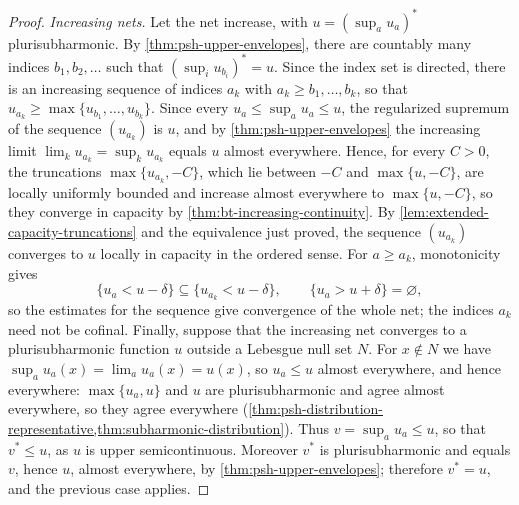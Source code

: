 \begin{proof}
\emph{Increasing nets.} Let the net increase, with $u=(\sup_au_a)^*$ plurisubharmonic. By \cref{thm:psh-upper-envelopes}, there are countably many indices $b_1,b_2,\ldots$ such that $(\sup_iu_{b_i})^*=u$. Since the index set is directed, there is an increasing sequence of indices $a_k$ with $a_k\geq b_1,\ldots,b_k$, so that $u_{a_k}\geq\max\{u_{b_1},\ldots,u_{b_k}\}$. Since every $u_a\leq\sup_au_a\leq u$, the regularized supremum of the sequence $(u_{a_k})$ is $u$, and by \cref{thm:psh-upper-envelopes} the increasing limit $\lim_ku_{a_k}=\sup_ku_{a_k}$ equals $u$ almost everywhere. Hence, for every $C>0$, the truncations $\max\{u_{a_k},-C\}$, which lie between $-C$ and $\max\{u,-C\}$, are locally uniformly bounded and increase almost everywhere to $\max\{u,-C\}$, so they converge in capacity by \cref{thm:bt-increasing-continuity}. By \cref{lem:extended-capacity-truncations} and the equivalence just proved, the sequence $(u_{a_k})$ converges to $u$ locally in capacity in the ordered sense. For $a\geq a_k$, monotonicity gives
\[
 \{u_a<u-\delta\}\subseteq\{u_{a_k}<u-\delta\},
 \qquad\{u_a>u+\delta\}=\varnothing,
\]
so the estimates for the sequence give convergence of the whole net; the indices $a_k$ need not be cofinal. Finally, suppose that the increasing net converges to a plurisubharmonic function $u$ outside a Lebesgue null set $N$. For $x\notin N$ we have $\sup_au_a(x)=\lim_au_a(x)=u(x)$, so $u_a\leq u$ almost everywhere, and hence everywhere: $\max\{u_a,u\}$ and $u$ are plurisubharmonic and agree almost everywhere, so they agree everywhere (\cref{thm:psh-distribution-representative,thm:subharmonic-distribution}). Thus $v=\sup_au_a\leq u$, so that $v^*\leq u$, as $u$ is upper semicontinuous. Moreover $v^*$ is plurisubharmonic and equals $v$, hence $u$, almost everywhere, by \cref{thm:psh-upper-envelopes}; therefore $v^*=u$, and the previous case applies.
\end{proof}

